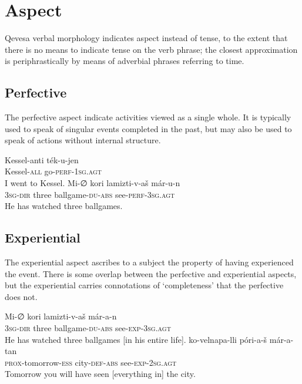 \documentclass[grammar]{subfiles}
\begin{document}
\section{Aspect}
\label{vp:sec_aspect}

Qevesa verbal morphology indicates aspect instead of tense, to the extent that
there is no means to indicate tense on the verb phrase; the closest
approximation is periphrastically by means of adverbial phrases referring to
time. 


\subsection{Perfective}
\label{vp:ssec_perfective}

The perfective aspect indicate activities viewed as a single whole.  It is
typically used to speak of singular events completed in the past, but may also
be used to speak of actions without internal structure.

\begin{exe}
  \ex {}
  \gll Kessel-anti ték-u-jen\\
  Kessel\textsc{-all} go\textsc{-perf-1sg.agt}\\
  \glt I went to Kessel.
  \ex {}
  \gll Mi-∅ kori lamizti-v-aš már-u-n\\ 
  \textsc{3sg-dir} three ballgame\textsc{-du-abs} see\textsc{-perf-3sg.agt}\\
  \glt He has watched three ballgames.
\end{exe}



\subsection{Experiential}
\label{vp:ssec_experiential}

The experiential aspect ascribes to a subject the property of having
experienced the event.  There is some overlap between the perfective and
experiential aspects, but the experiential carries connotations of
‘completeness’ that the perfective does not.   

\begin{exe}
  \ex {}
  \gll Mi-∅ kori lamizti-v-aš már-a-n\\ 
  \textsc{3sg-dir} three ballgame\textsc{-du-abs} see\textsc{-exp-3sg.agt}\\
  \glt He has watched three ballgames [in his entire life].
  \ex {}
  \gll ko-velnapa-lli póri-a-š már-a-tan\\
  \textsc{prox}-tomorrow-\textsc{ess} city\textsc{-def-abs} see\textsc{-exp-2sg.agt}\\
  \glt Tomorrow you will have seen [everything in] the city.
\end{exe}
\end{document}
